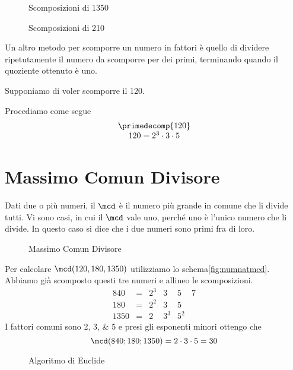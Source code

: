 \begin{figure} 
\centering

	\caption[]{Scomposizioni di \num{1350}}
	\label{fig:AlberoBinario3}
\end{figure}%
\begin{figure} 
\centering

	\caption[]{Scomposizioni di \num{210}}
	\label{fig:AlberoBinario6}
\end{figure}%
Un altro metodo per scomporre un numero in fattori  è quello di dividere ripetutamente  il numero da scomporre per dei primi, terminando quando il quoziente ottenuto è uno.
\begin{esempiot}{}{}
Supponiamo di voler scomporre il \num{120}. 
\end{esempiot}
Procediamo come segue
	\[
	\begin{array}{c}
	\primedecomp{120}\\
	120 =2^3\cdot 3\cdot 5
	\end{array}
	\]

\section{Massimo Comun Divisore}
\label{sec:macdNaturali}
Dati due o più numeri, il $\mcd$ è il numero più grande in comune che li divide tutti. Vi sono casi, in cui il $\mcd$ vale uno, perché uno è l'unico numero che li divide. In questo caso si dice che i due numeri sono primi fra di loro.
 	\begin{figure}
	\centering

	\caption{Massimo Comun Divisore}
	\label{fig:numnatmcd}
\end{figure}
 Per calcolare $\mcd(120,180,1350)$ utilizziamo lo schema\nobs\vref{fig:numnatmcd}. Abbiamo già scomposto questi tre numeri e  	
 allineo le scomposizioni.
   \[
   \begin{array}{rcllll}
   840&= & 2^3 & 3& 5 & 7\\
   180&= & 2^2 & 3& 5 \\
   1350&= & 2 & 3^3& 5^2
   \end{array}
   \]
   I fattori comuni sono \numlist{2;3;5} e presi gli esponenti minori ottengo che
     \[\mcd(840;180;1350)=2\cdot 3\cdot 5=30 \]
    \begin{figure}
    	\centering
    
    	\caption{Algoritmo di Euclide}
    	\label{fig:algoritmoEuclide}
    \end{figure}
   
